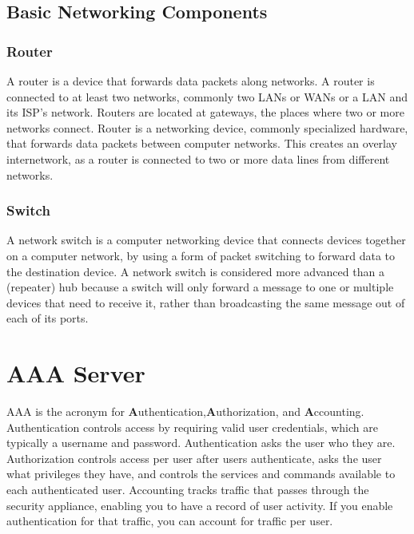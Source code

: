 \documentclass[12pt]{report}
\begin{document}
   \subsection{Basic Networking Components}
   \subsubsection{Router}
A router is a device that forwards data packets along networks. A router is connected to at least two networks, commonly two LANs or WANs or a LAN and its ISP's network. Routers are located at gateways, the places where two or more networks connect. Router is a networking device, commonly specialized hardware, that forwards data packets between computer networks. This creates an overlay internetwork, as a router is connected to two or more data lines from different networks. 

\subsubsection{Switch}
A network switch is a computer networking device that connects devices together on a computer network, by using a form of packet switching to forward data to the destination device. A network switch is considered more advanced than a (repeater) hub because a switch will only forward a message to one or multiple devices that need to receive it, rather than broadcasting the same message out of each of its ports.


\newpage
\section{AAA Server}
AAA is the acronym for \textbf{A}uthentication,\textbf{A}uthorization, and \textbf{A}ccounting. Authentication controls access by requiring valid user credentials, which are typically a username and password. Authentication asks the user who they are. Authorization controls access per user after users authenticate, asks the user what privileges they have, and controls the services and commands available to each authenticated user. Accounting tracks traffic that passes through the security appliance, enabling you to have a record of user activity. If you enable authentication for that traffic, you can account for traffic per user. 
\end{document}
